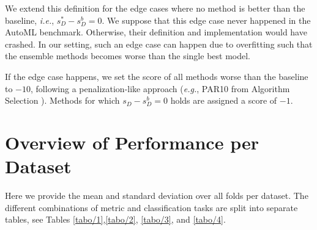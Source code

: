 \documentclass[11pt]{article}
\begin{document}
{We extend this definition for the edge cases where no method is better than the baseline, \emph{i.e.}, $s_{D}^* - s_{D}^{b} = 0$.
We suppose that this edge case never happened in the AutoML benchmark. Otherwise, their definition and implementation would have crashed.
In our setting, such an edge case can happen due to overfitting such that the ensemble methods becomes worse than the single best model. 

If the edge case happens, we set the score of all methods worse than the baseline to $-10$, following a penalization-like approach (\emph{e.g.}, PAR10 from Algorithm Selection \citep{DBLP:journals/ai/LindauerRK19}). 
Methods for which $s_{D} - s_{D}^{b} = 0$ holds are assigned a score of $-1$. 



\section{Overview of Performance per Dataset}
\label{apdx/overview_of_performance_per_dataset}

Here we provide the mean and standard deviation over all folds per dataset.
The different combinations of metric and classification tasks are split into separate tables, see Tables \ref{tabo/1},\ref{tabo/2}, \ref{tabo/3}, and \ref{tabo/4}. 
}
\end{document}
